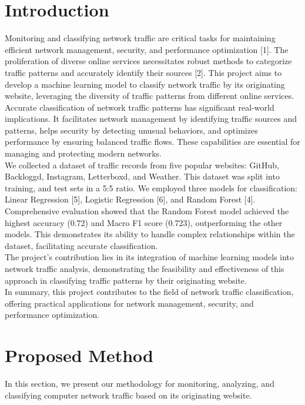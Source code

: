 \documentclass[10pt,sigconf,letterpaper,nonacm]{acmart}
\begin{document}
\section{Introduction}
    Monitoring and classifying network traffic are critical tasks
for maintaining efficient network management, security, and
performance optimization [1]. The proliferation of diverse
online services necessitates robust methods to categorize
traffic patterns and accurately identify their sources [2]. This
project aims to develop a machine learning model to classify
network traffic by its originating website, leveraging the
diversity of traffic patterns from different online services.
Accurate classification of network traffic patterns has significant
real-world implications. It facilitates network
management by identifying traffic sources and patterns, helps
security by detecting unusual behaviors, and optimizes performance
by ensuring balanced traffic flows. These capabilities
are essential for managing and protecting modern
networks.\\
We collected a dataset of traffic records from five popular
websites: GitHub, Backloggd, Instagram, Letterboxd,
and Weather. This dataset was split into training, and test sets
in a 5:5 ratio. We employed three models for classification:
Linear Regression [5], Logistic Regression [6], and Random
Forest [4].\\
Comprehensive evaluation showed that the Random Forest
model achieved the highest accuracy (0.72) and Macro F1
score (0.723), outperforming the other models. This demonstrates
its ability to handle complex relationships within the
dataset, facilitating accurate classification.\\
The project’s contribution lies in its integration of machine
learning models into network traffic analysis, demonstrating
the feasibility and effectiveness of this approach in classifying
traffic patterns by their originating website.\\
In summary, this project contributes to the field of network
traffic classification, offering practical applications for
network management, security, and performance optimization.

\section{Proposed Method}

    In this section, we present our methodology for monitoring,
analyzing, and classifying computer network traffic based
on its originating website.
\end{document}
